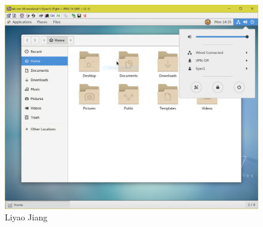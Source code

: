 \documentclass[letterpaper]{article}
\begin{document}
\begin{figure}[H]
 \centering
 \includegraphics[width=\textwidth]{liyao.jpg}
 \caption{Liyao Jiang}
\end{figure}
\end{document}
